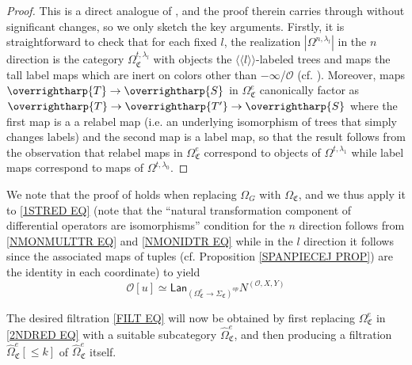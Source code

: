\documentclass[a4paper,10pt
,draft
]{article}%
\numberwithin{equation}{section}
\numberwithin{figure}{section}
\theoremstyle{definition} %
\newcommand{\vect}[1]{\text{\overrightharp{\ensuremath{#1}}}}
\renewcommand{\O}{\ensuremath{\mathcal O}}
\newcommand{\1}{\ensuremath{\mathbbm 1}}%
\begin{document}
\begin{proof}
This is a direct analogue of \cite[Prop. 5.41]{BP_geo}, and the proof therein carries through without significant changes, so we only sketch the key arguments.
Firstly, it is straightforward to check that for each fixed $l$,
the realization $|\Omega^{n,\lambda_l}|$
in the $n$ direction is the category 
$\Omega^{t,\lambda_l}_{\mathfrak{C}}$
with objects the $\langle \langle l \rangle \rangle$-labeled trees and  maps the tall label maps which are inert on colors other than $-\infty$/$\O$ (cf. \cite[Rem. 5.36]{BP_geo}).
Moreover, maps 
$\vect{T} \to \vect{S}$
in 
$\Omega^e_{\mathfrak{C}}$
canonically factor as
$\vect{T} \to \vect{T'} \to \vect{S}$
where the first map is a a relabel map (i.e. an underlying isomorphism of trees that simply changes labels) and the second map is a label map, 
so that the result follows from the observation that relabel maps in 
$\Omega^e_{\mathfrak{C}}$
correspond to objects of  
$\Omega^{t,\lambda_1}$
while label maps correspond to maps of
$\Omega^{t,\lambda_0}$.
\end{proof}



We note that the proof of \cite[Prop 5.37]{BP_geo} %
holds when replacing $\Omega_G$ with $\Omega_{\mathfrak C}$,
and we thus 
apply it to
\eqref{1STRED EQ}
(note that the ``natural transformation component of differential operators are isomorphisms'' condition for the $n$ direction follows from \eqref{NMONMULTTR EQ} and \eqref{NMONIDTR EQ}
while in the $l$ direction it follows since the associated maps of tuples (cf. Proposition \ref{SPANPIECEJ PROP}) are the identity in each coordinate)
to yield
\begin{equation}\label{2NDRED EQ}
\O[u] \simeq
	\mathsf{Lan}_{\left(\Omega_{\mathfrak C}^{e} \to
	\Sigma_{\mathfrak C}\right)^{op}} N^{(\O,X,Y)}
\end{equation}



The desired filtration \eqref{FILT EQ} will now be obtained by
first replacing $\Omega_{\mathfrak C}^e$ in \eqref{2NDRED EQ} with a suitable subcategory $\widehat{\Omega}_{\mathfrak C}^{e}$,
and then producing a filtration
$\widehat{\Omega}_{\mathfrak C}^{e}[\leq k]$
of 
$\widehat{\Omega}_{\mathfrak C}^{e}$ itself.

\end{document}
